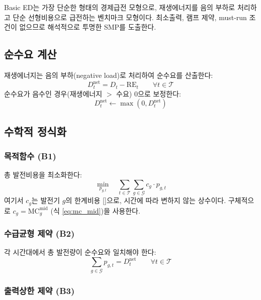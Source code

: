 \documentclass[11pt, a4paper]{article}
\begin{document}
Basic ED는 가장 단순한 형태의 경제급전 모형으로,
재생에너지를 음의 부하로 처리하고 단순 선형비용으로 급전하는 벤치마크 모형이다.
최소출력, 램프 제약, must-run 조건이 없으므로 해석적으로 투명한 SMP를 도출한다.

\subsection{순수요 계산}

재생에너지는 음의 부하(negative load)로 처리하여 순수요를 산출한다:
\begin{equation}\label{eq:net_demand}
    D_t^{\text{net}} = D_t - \text{RE}_t \qquad \forall t \in \mathcal{T}
\end{equation}
순수요가 음수인 경우(재생에너지 $>$ 수요) 0으로 보정한다:
\begin{equation}
    D_t^{\text{net}} \leftarrow \max(0, D_t^{\text{net}})
\end{equation}

\subsection{수학적 정식화}

\subsubsection{목적함수 (B1)}

총 발전비용을 최소화한다:
\begin{equation}\label{eq:basic_obj}
    \boxed{\min_{p_{g,t}} \quad \sum_{t \in \mathcal{T}} \sum_{g \in \mathcal{G}} c_g \cdot p_{g,t}}
\end{equation}
여기서 $c_g$는 발전기 $g$의 한계비용 []으로, 시간에 따라 변하지 않는 상수이다.
구체적으로 $c_g = \text{MC}_g^{\text{mid}}$ (식 \eqref{eq:mc_mid})을 사용한다.

\subsubsection{수급균형 제약 (B2)}

각 시간대에서 총 발전량이 순수요와 일치해야 한다:
\begin{equation}\label{eq:basic_balance}
    \sum_{g \in \mathcal{G}} p_{g,t} = D_t^{\text{net}} \qquad \forall t \in \mathcal{T}
\end{equation}

\subsubsection{출력상한 제약 (B3)}
\end{document}
